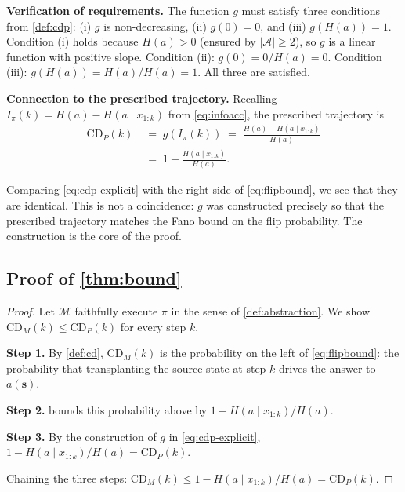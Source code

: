 \documentclass[11pt]{article}
\newcommand{\CDP}{\mathrm{CD}_{P}}
\newcommand{\CDM}{\mathrm{CD}_{M}}
\newcommand{\stepk}{k}
\begin{document}
\noindent\textbf{Verification of requirements.} The function $g$ must satisfy
three conditions from \cref{def:cdp}: (i) $g$ is non-decreasing,
(ii) $g(0)=0$, and (iii) $g(H(a))=1$. Condition (i) holds because
$H(a)>0$ (ensured by $|\mathcal{A}|\ge 2$), so $g$ is a linear function with
positive slope. Condition (ii): $g(0)=0/H(a)=0$. Condition (iii):
$g(H(a))=H(a)/H(a)=1$. All three are satisfied.

\noindent\textbf{Connection to the prescribed trajectory.}
Recalling $I_{\pi}(\stepk)=H(a)-H(a\mid x_{1{:}\stepk})$ from
\cref{eq:infoacc}, the prescribed trajectory is
\begin{equation}
\label{eq:cdp-explicit}
\begin{split}
\CDP(\stepk) &\;=\; g\!\left(I_{\pi}(\stepk)\right)
\;=\; \frac{H(a)-H\!\left(a\mid x_{1{:}\stepk}\right)}{H(a)} \\
&\;=\; 1 - \frac{H\!\left(a\mid x_{1{:}\stepk}\right)}{H(a)} .
\end{split}
\end{equation}

\noindent Comparing \cref{eq:cdp-explicit} with the right side of
\cref{eq:flipbound}, we see that they are identical. This is not a coincidence:
$g$ was constructed precisely so that the prescribed trajectory matches the
Fano bound on the flip probability. The construction is the core of the proof.

\subsection{Proof of \texorpdfstring{\cref{thm:bound}}{Theorem 1}}
\label{app:proof-main}

\begin{proof}
Let $\mathcal{M}$ faithfully execute $\pi$ in the sense of
\cref{def:abstraction}. We show $\CDM(\stepk)\le\CDP(\stepk)$ for every step
$\stepk$.

\textbf{Step 1.} By \cref{def:cd}, $\CDM(\stepk)$ is the probability on the
left of \cref{eq:flipbound}: the probability that transplanting the source
state at step $\stepk$ drives the answer to $a(\mathbf{s})$.

\textbf{Step 2.}  bounds this probability above by
$1-H(a\mid x_{1{:}\stepk})/H(a)$.

\textbf{Step 3.} By the construction of $g$ in \cref{eq:cdp-explicit},
$1-H(a\mid x_{1{:}\stepk})/H(a) = \CDP(\stepk)$.

Chaining the three steps: $\CDM(\stepk) \le 1-H(a\mid x_{1{:}\stepk})/H(a) =
\CDP(\stepk)$.
\end{proof}
\end{document}
